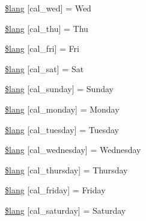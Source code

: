 \begin{DoxyCompactItemize}
\mbox{\hyperlink{calendar__lang_8php_a16288f487a1e9545fd4028a87a08860e}{\$lang}} \mbox{[}\textquotesingle{}cal\+\_\+wed\textquotesingle{}\mbox{]} = \textquotesingle{}Wed\textquotesingle{}
\item 
\mbox{\hyperlink{calendar__lang_8php_a8e4a3a703cca8fa9b3ebb3fd78405eb9}{\$lang}} \mbox{[}\textquotesingle{}cal\+\_\+thu\textquotesingle{}\mbox{]} = \textquotesingle{}Thu\textquotesingle{}
\item 
\mbox{\hyperlink{calendar__lang_8php_a9b1c7be5fe2d30a11f163353a64c27aa}{\$lang}} \mbox{[}\textquotesingle{}cal\+\_\+fri\textquotesingle{}\mbox{]} = \textquotesingle{}Fri\textquotesingle{}
\item 
\mbox{\hyperlink{calendar__lang_8php_a605939391e56524991f15d2c05803f48}{\$lang}} \mbox{[}\textquotesingle{}cal\+\_\+sat\textquotesingle{}\mbox{]} = \textquotesingle{}Sat\textquotesingle{}
\item 
\mbox{\hyperlink{calendar__lang_8php_a6e603a253bd80f345ef2b0f379b2febb}{\$lang}} \mbox{[}\textquotesingle{}cal\+\_\+sunday\textquotesingle{}\mbox{]} = \textquotesingle{}Sunday\textquotesingle{}
\item 
\mbox{\hyperlink{calendar__lang_8php_abbfff77b914c0bf23419c97abe0a9023}{\$lang}} \mbox{[}\textquotesingle{}cal\+\_\+monday\textquotesingle{}\mbox{]} = \textquotesingle{}Monday\textquotesingle{}
\item 
\mbox{\hyperlink{calendar__lang_8php_add99c3523c9b2114d31410c23659a8a2}{\$lang}} \mbox{[}\textquotesingle{}cal\+\_\+tuesday\textquotesingle{}\mbox{]} = \textquotesingle{}Tuesday\textquotesingle{}
\item 
\mbox{\hyperlink{calendar__lang_8php_a6746b344cd9b8de8f4a87de321fb66b0}{\$lang}} \mbox{[}\textquotesingle{}cal\+\_\+wednesday\textquotesingle{}\mbox{]} = \textquotesingle{}Wednesday\textquotesingle{}
\item 
\mbox{\hyperlink{calendar__lang_8php_a9343f34c89f755cba1f323844c88bc60}{\$lang}} \mbox{[}\textquotesingle{}cal\+\_\+thursday\textquotesingle{}\mbox{]} = \textquotesingle{}Thursday\textquotesingle{}
\item 
\mbox{\hyperlink{calendar__lang_8php_a7440188074fc5e015fb10981196f66f1}{\$lang}} \mbox{[}\textquotesingle{}cal\+\_\+friday\textquotesingle{}\mbox{]} = \textquotesingle{}Friday\textquotesingle{}
\item 
\mbox{\hyperlink{calendar__lang_8php_aff18a3db9c4f62f90177e23cb1e72f4c}{\$lang}} \mbox{[}\textquotesingle{}cal\+\_\+saturday\textquotesingle{}\mbox{]} = \textquotesingle{}Saturday\textquotesingle{}
\item 

\end{DoxyCompactItemize}
